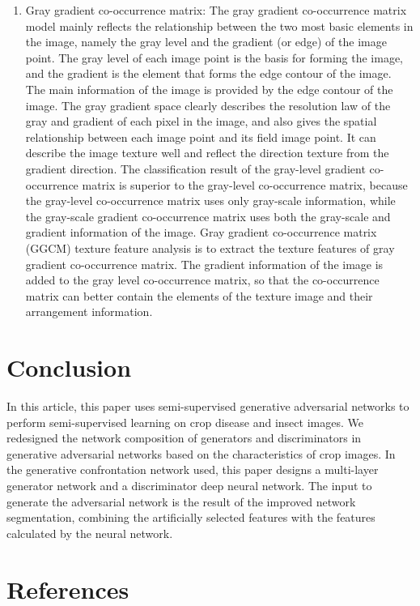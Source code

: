 \documentclass[11pt,en]{elegantpaper}
\begin{document}
\begin{enumerate}
	\item Gray gradient co-occurrence matrix: The gray gradient co-occurrence matrix model mainly reflects the relationship between the two most basic elements in the image, namely the gray level and the gradient (or edge) of the image point. The gray level of each image point is the basis for forming the image, and the gradient is the element that forms the edge contour of the image. The main information of the image is provided by the edge contour of the image. The gray gradient space clearly describes the resolution law of the gray and gradient of each pixel in the image, and also gives the spatial relationship between each image point and its field image point. It can describe the image texture well and reflect the direction texture from the gradient direction. The classification result of the gray-level gradient co-occurrence matrix is superior to the gray-level co-occurrence matrix, because the gray-level co-occurrence matrix uses only gray-scale information, while the gray-scale gradient co-occurrence matrix uses both the gray-scale and gradient information of the image. Gray gradient co-occurrence matrix (GGCM) texture feature analysis is to extract the texture features of gray gradient co-occurrence matrix. The gradient information of the image is added to the gray level co-occurrence matrix, so that the co-occurrence matrix can better contain the elements of the texture image and their arrangement information.
\end{enumerate}

\section{Conclusion}
In this article, this paper uses semi-supervised generative adversarial networks to perform semi-supervised learning on crop disease and insect images. We redesigned the network composition of generators and discriminators in generative adversarial networks based on the characteristics of crop images. In the generative confrontation network used, this paper designs a multi-layer generator network and a discriminator deep neural network. The input to generate the adversarial network is the result of the improved network segmentation, combining the artificially selected features with the features calculated by the neural network.\section{References}


\end{document}
